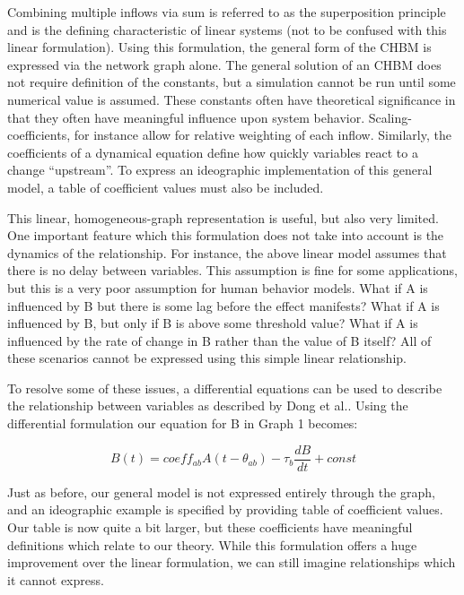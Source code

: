\documentclass[runningheads,a4paper]{llncs}
\begin{document}
Combining multiple inflows via sum is referred to as the superposition principle and is the defining characteristic of linear systems (not to be confused with this linear formulation).
Using this formulation, the general form of the CHBM is expressed via the network graph alone.
The general solution of an CHBM does not require definition of the constants, but a simulation cannot be run until some numerical value is assumed. 
These constants often have theoretical significance in that they often have meaningful influence upon system behavior. 
Scaling-coefficients, for instance allow for relative weighting of each inflow. 
Similarly, the coefficients of a dynamical equation define how quickly variables react to a change ``upstream''.
To express an ideographic implementation of this general model, a table of coefficient values must also be included. 

This linear, homogeneous-graph representation is useful, but also very limited.
One important feature which this formulation does not take into account is the dynamics of the relationship.
For instance, the above linear model assumes that there is no delay between variables.
This assumption is fine for some applications, but this is a very poor assumption for human behavior models. 
What if A is influenced by B but there is some lag before the effect manifests?
What if A is influenced by B, but only if B is above some threshold value? 
What if A is influenced by the rate of change in B rather than the value of B itself? 
All of these scenarios cannot be expressed using this simple linear relationship. 

To resolve some of these issues, a differential equations can be used to describe the relationship between variables as described by Dong et al.\cite{dongrivera2012dynamical}. 
Using the differential formulation our equation for B in Graph 1 becomes:

\begin{equation}
    B(t) = coeff_{ab}A(t-\theta_{ab}) - \tau_{b}\frac{dB}{dt} + const
    \label{fluid-flow-eq}
\end{equation}

Just as before, our general model is not expressed entirely through the graph, and an  ideographic example is specified by providing table of coefficient values.
Our table is now quite a bit larger, but these coefficients have meaningful definitions which relate to our theory.
While this formulation offers a huge improvement over the linear formulation, we can still imagine relationships which it cannot express.
\end{document}
